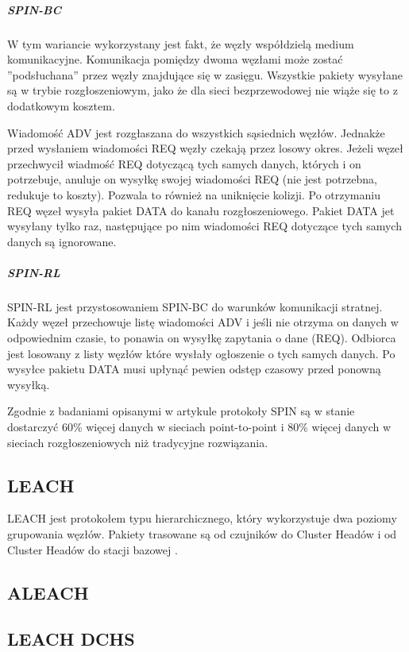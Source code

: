 \subparagraph{SPIN-BC}
W tym wariancie wykorzystany jest fakt, że węzły współdzielą medium komunikacyjne. Komunikacja pomiędzy dwoma węzłami może zostać ''podsłuchana'' przez węzły znajdujące się w zasięgu. Wszystkie pakiety wysyłane są w trybie rozgłoszeniowym, jako że dla sieci bezprzewodowej nie wiąże się to z dodatkowym kosztem.

Wiadomość ADV jest rozgłaszana do wszystkich sąsiednich węzłów. Jednakże przed wysłaniem wiadomości REQ węzły czekają przez losowy okres. Jeżeli węzeł przechwycił wiadmość REQ dotyczącą tych samych danych, których i on potrzebuje, anuluje on wysyłkę swojej wiadomości REQ (nie jest potrzebna, redukuje to koszty). Pozwala to również na uniknięcie kolizji. Po otrzymaniu REQ węzeł wysyła pakiet DATA do kanału rozgłoszeniowego. Pakiet DATA jet wysyłany tylko raz, następujące po nim wiadomości REQ dotyczące tych samych danych są ignorowane.
\subparagraph{SPIN-RL}
SPIN-RL jest przystosowaniem SPIN-BC do warunków komunikacji stratnej. Każdy węzeł przechowuje listę wiadomości ADV i jeśli nie otrzyma on danych w odpowiednim czasie, to ponawia on wysyłkę zapytania o dane (REQ). Odbiorca jest losowany z listy węzłów które wysłały ogłoszenie o tych samych danych.
Po wysyłce pakietu DATA musi upłynąć pewien odstęp czasowy przed ponowną wysyłką.

Zgodnie z badaniami opisanymi w artykule \cite{Kulik2002} protokoły SPIN są w stanie dostarczyć 60\% więcej danych w sieciach point-to-point i 80\% więcej danych w sieciach rozgłoszeniowych niż tradycyjne rozwiązania.  
\subsection{LEACH}
LEACH jest protokołem typu hierarchicznego, który wykorzystuje dwa poziomy grupowania węzłów. Pakiety trasowane są od czujników do Cluster Headów i od Cluster Headów do stacji bazowej \cite{Yu2006}.
\subsection{ALEACH}
\subsection{LEACH DCHS}